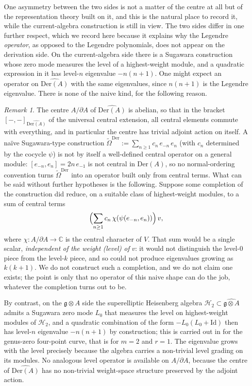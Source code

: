 \documentclass[11pt]{amsart}
\theoremstyle{definition}
\theoremstyle{remark}
\newtheorem{remark}[theorem]{Remark}
\newcommand{\C}{\mathbb{C}}
\newcommand{\g}{\mathfrak{g}}
\newcommand{\Der}{\mathrm{Der}}
\newcommand{\pa}{\partial}
\newcommand{\hDer}{\widehat{\Der(A)}}
\begin{document}
One asymmetry between the two sides is not a matter of the centre at all but of
the representation theory built on it, and this is the natural place to record
it, while the current-algebra construction is still in view.
The two sides differ in one further respect, which we record here because it
explains why the Legendre \emph{operator}, as opposed to the Legendre
polynomials, does not appear on the derivation side. On the current-algebra
side there is a Sugawara construction whose zero mode measures the level of a
highest-weight module, and a quadratic expression in it has level-$n$
eigenvalue $-n(n+1)$. One might expect an operator on $\hDer$ with the same
eigenvalues, since $n(n+1)$ is the Legendre eigenvalue. There is none of the
naive kind, for the following reason.

\begin{remark}
\label{rem:der-obstruction}
The centre $A/\pa A$ of $\widehat{\Der(A)}$ is abelian, so that in
the bracket $[-, -]_{\widehat{\Der(A)}}$ of the universal central extension,
all central elements
commute with everything, and in particular the centre has trivial
adjoint action on itself.
A na\"ive Sugawara-type construction
$\tilde\Omega^{\Der} := \sum_{n \geq 1} c_n\, e_{-n}\, e_n$
(with $c_n$ determined by the cocycle $\psi$) is not by itself a well-defined
central operator on a general module: $[e_{-n},e_n]=2n\,e_{-1}$ is not central
in $\Der(A)$, so no normal-ordering convention turns $\tilde\Omega^{\Der}$ into
an operator built only from central terms. What can be said without further
hypotheses is the following. Suppose some completion of the construction did
reduce, on a suitable class of highest-weight modules, to a sum of central
terms
\[
  \Bigl(\sum_{n \geq 1} c_n\,\chi(\psi(e_{-n}, e_n))\Bigr)\,v,
\]
where $\chi\colon A/\pa A \to \C$ is the central character of $V$. That sum
would be a single scalar, \emph{independent of the weight (level) of} $v$: it
would not distinguish the level-$0$ piece from the level-$k$ piece, and so
could not produce eigenvalues growing as $k(k+1)$. We do not construct such a
completion, and we do not claim one exists; the point is only that no operator
of this naive shape can do the job, whatever the completion turns out to be.

By contrast, on the $\g\otimes A$ side the superelliptic Heisenberg
algebra $\mathcal{H}_2 \subset \widehat{\g\otimes A}$ admits a Sugawara
zero mode $L_0$ that measures the level on highest-weight modules
of $\mathcal{H}_2$, and a quadratic combination of the form
$-L_0(L_0+\mathrm{Id})$ then has level-$n$ eigenvalue $-n(n+1)$ by
construction; this is carried out in \cite{P4_RepMechanism} for the genus-zero
four-point curve, that is for $m=2$ and $r=1$. The eigenvalue grows with the
level precisely because the
algebra carries a non-trivial level grading on its modules.
No analogous level operator is available on $A/\pa A$, because the
centre of $\widehat{\Der(A)}$ has no non-trivial weight-space structure
preserved by the adjoint action.


\end{remark}
\end{document}
